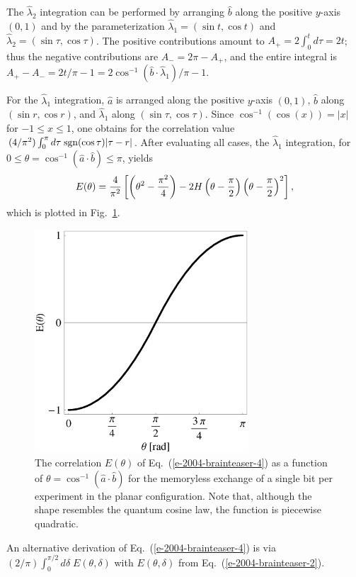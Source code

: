 \documentclass[prl,showpacs,showkeys,amsfonts,preprint]{revtex4}
\begin{document}
The ${\hat \lambda}_2$ integration can be performed by
arranging
${\hat b}$ along the positive $y$-axis $(0,1)$ and by the parameterization
${\hat \lambda}_1=(\sin t ,\cos t )$
and
${\hat \lambda}_2=(\sin \tau ,\cos \tau )$.
The positive contributions amount to $A_+=2\int_0^t d\tau =2t$;
thus the negative contributions are $A_-= 2\pi -A_+$, and the entire integral
is $A_+-A_-=2t/\pi -1=2\cos^{-1}({\hat b}\cdot {\hat \lambda}_1)/\pi -1$.

For the ${\hat \lambda}_1$ integration,
${\hat a}$ is arranged along the positive $y$-axis $(0,1)$,
${\hat b}$ along $(\sin r,\cos r)$, and
${\hat \lambda}_1$ along $(\sin \tau ,\cos \tau )$.
Since $\cos^{-1} (\cos (x))=\vert x\vert$ for $-1\le x\le 1$,
one obtains for the correlation value
$(4/\pi^2)\int_0^\pi d \tau \;{\rm sgn}(\cos \tau ) \vert \tau -r\vert$.
After evaluating all cases, the ${\hat \lambda}_1$ integration,
for $0\le \theta =\cos^{-1}({\hat a}\cdot {\hat b})\le \pi $, yields
\begin{equation}
E(\theta ) =
{4\over \pi^2}
\left[
\left(\theta ^2 -{\pi^2 \over 4}\right)
-2
H\left(\theta -{\pi \over 2}\right)
\left(\theta -{\pi \over 2} \right)^2
\right],
\label{e-2004-brainteaser-4}
\end{equation}
which is plotted in Fig.~\ref{2004-brainteaser-f3}.
\begin{figure}[htbp]
  \centering
 \includegraphics[width=80mm]{2004-brainteaser-f3}
  \caption{The correlation $E(\theta )$ of Eq.~(\ref{e-2004-brainteaser-4}) as a function of
$\theta =\cos^{-1}({\hat a}\cdot {\hat b})$ for the memoryless exchange of a single
bit per experiment in the planar configuration.
Note that, although the shape resembles the quantum cosine law,
the function is piecewise quadratic.}
  \label{2004-brainteaser-f3}
\end{figure}
An alternative derivation of Eq.~(\ref{e-2004-brainteaser-4}) is via
$(2/\pi )\int_0^{\pi /2} d\delta \; E(\theta,\delta )$ with $E(\theta,\delta )$
from Eq.~(\ref{e-2004-brainteaser-2}).
\end{document}
